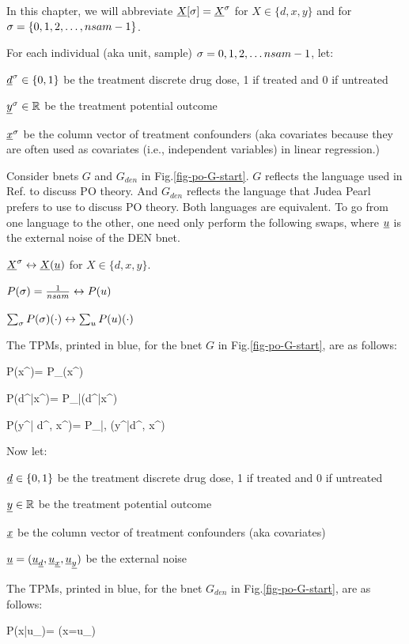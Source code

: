 In this chapter, we will
abbreviate
${\underline{X}}{[\sigma]}={\underline{X}}^\sigma$
for
$X\in \{d, x, y\}$ 
and for $\sigma=\{0,1,2, \ldots, nsam-1\}$.


For each individual (aka unit, sample) 
$\sigma=0, 1, 2, \ldots nsam-1$, let:

${\underline{d}}^\sigma\in\{0,1\}$ be the
 treatment discrete drug dose,  1 if treated and 0 if untreated

${\underline{y}}^\sigma\in { \mathbb{R}}$ be the
 treatment potential outcome

${\underline{x}}^\sigma$ be the column vector of treatment 
confounders 
(aka covariates because they
are often used as covariates (i.e., 
independent
variables) in linear regression.)

Consider bnets $G$ and $G_{den}$
in 
 Fig.\ref{fig-po-G-start}.
$G$ reflects the language
used in Ref.\cite{book-mixtape}
to discuss PO theory. And
$G_{den}$ reflects
the language that Judea Pearl 
prefers to use to discuss PO theory.
Both languages are equivalent. To go from
one language to the other, one need only
perform the following
swaps, where ${\underline{u}}$
is the external noise of the DEN bnet.

${\underline{X}}^\sigma\leftrightarrow {\underline{X}}({\underline{u}})$
for $X\in \{d, x, y\}$.

$P(\sigma)=\frac{1}{nsam}\leftrightarrow P(u)$

$\sum_\sigma P(\sigma) (\cdot)
\leftrightarrow \sum_uP(u) (\cdot)$




The TPMs, printed in blue,
for the bnet
$G$
in Fig.\ref{fig-po-G-start},
are as follows:


\beq\color{blue}
P(x^\s)=
P_{\rvx}(x^\s)
\eeq

\beq\color{blue}
P(d^\s|x^\s)=
P_{\rvd|\rvx}(d^\s|x^\s)
\eeq


\beq\color{blue}
P(y^\s| d^\s, x^\s)=
P_{\rvy|\rvd, \rvx}(y^\s|d^\s, x^\s)
\eeq




Now let:

${\underline{d}}\in\{0,1\}$
be the treatment discrete drug dose,  1 if treated and 0 if untreated

${\underline{y}}\in { \mathbb{R}}$ be the
 treatment potential outcome

${\underline{x}}$ be the column vector of 
treatment
confounders (aka covariates)


${\underline{u}}=({\underline{u}}_{\underline{d}}, 
{\underline{u}}_{\underline{x}}, {\underline{u}}_{\underline{y}})$ be the
external noise

The TPMs, printed in blue,
for the bnet
$G_{den}$
in Fig.\ref{fig-po-G-start},
are as follows:


\beq \color{blue}
P(x|u_\rvx)= \indi(\;\;x=u_\rvx\;\;)
\eeq

